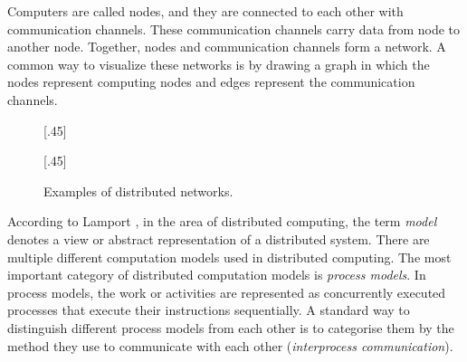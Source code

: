 Computers are called nodes, and they are connected to each other with communication channels.
These communication channels carry data from node to another node.
Together, nodes and communication channels form a network.
A common way to visualize these networks is by drawing a graph in which the nodes represent computing nodes and edges represent the communication channels.
\cite{HirvonenSuomelaDistAlg2020}


\begin{figure}[H]
    [.45\linewidth] {
    \centering
  }
  \hfill
    [.45\linewidth] {
    \centering
  }
  \caption{Examples of distributed networks.}
  \label{fig:dist_comp1}
\end{figure}
According to Lamport \cite{DBLP:books/el/leeuwen90/LamportL90}, in the area of distributed computing, the term \emph{model} denotes a view or abstract representation of a distributed system.
There are multiple different computation models used in distributed computing.
The most important category of distributed computation models is \emph{process models}.
In process models, the work or activities are represented as concurrently executed processes that execute their instructions sequentially.
A standard way to distinguish different process models from each other is to categorise them by the method they use to communicate with each other (\emph{interprocess communication}).
\cite{DBLP:books/el/leeuwen90/LamportL90}


